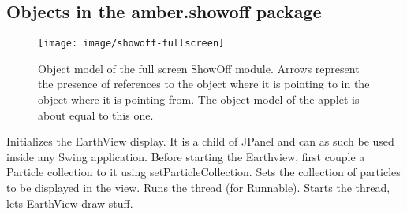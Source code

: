 \subsection{Objects in the amber.showoff package}


\begin{figure}[htp]
  \centering
  \texttt{[image: image/showoff-fullscreen]}
  \caption{\label{fig:showoff-fullscreen}Object model of the full screen
    ShowOff module. Arrows represent the presence of references to the object
    where it is pointing to in the object where it is pointing from. The object
    model of the applet is about equal to this one.}
\end{figure}



\begin{classmetadata}
\end{classmetadata}

\begin{interface}
    {Initializes the EarthView display. It is a child of JPanel and can as such
    be used inside any Swing application. Before starting the Earthview, first
    couple a Particle collection to it using setParticleCollection.}
    {Sets the collection of particles to be displayed in the view.}
    {Runs the thread (for Runnable).}
    {Starts the thread, lets EarthView draw stuff.}
\end{interface}




\begin{classmetadata}
\end{classmetadata}

